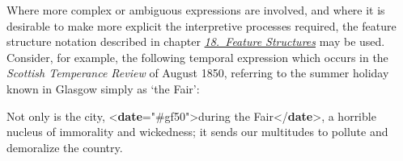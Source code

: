 Where more complex or ambiguous expressions are involved, and where it is desirable to make more explicit the interpretive processes required, the feature structure notation described in chapter \textit{\hyperref[FS]{18.\ Feature Structures}} may be used. Consider, for example, the following temporal expression which occurs in the \textit{Scottish Temperance Review} of August 1850, referring to the summer holiday known in Glasgow simply as ‘the Fair’: \par\bgroup{}\exampleFont \begin{shaded}\noindent\mbox{}Not only is the city, {<\textbf{date}\hspace*{1em}{ana}="{\#gf50}">}during the Fair{</\textbf{date}>}, a horrible\mbox{}\newline 
 nucleus of immorality and wickedness; it sends our multitudes to pollute and demoralize the country.\end{shaded}\egroup\par \par
